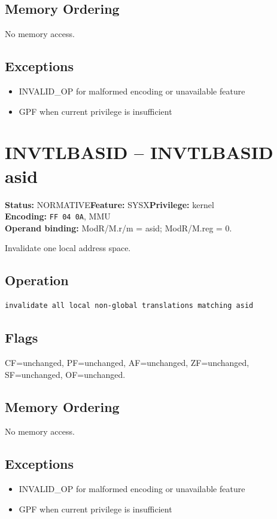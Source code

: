 \documentclass[10pt]{article}
\begin{document}
\subsection*{Memory Ordering}
No memory access.
\subsection*{Exceptions}
\begin{itemize}
\item INVALID\_OP for malformed encoding or unavailable feature
\item GPF when current privilege is insufficient
\end{itemize}
\clearpage

\section{INVTLBASID -- INVTLBASID asid}
\textbf{Status:} NORMATIVE\quad \textbf{Feature:} SYSX\quad \textbf{Privilege:} kernel\\
\textbf{Encoding:} \texttt{FF 04 0A}, MMU\\
\textbf{Operand binding:} ModR/M.r/m = asid; ModR/M.reg = 0.

Invalidate one local address space.

\subsection*{Operation}
\begin{lstlisting}
invalidate all local non-global translations matching asid
\end{lstlisting}
\subsection*{Flags}
CF=unchanged, PF=unchanged, AF=unchanged, ZF=unchanged, SF=unchanged, OF=unchanged.
\subsection*{Memory Ordering}
No memory access.
\subsection*{Exceptions}
\begin{itemize}
\item INVALID\_OP for malformed encoding or unavailable feature
\item GPF when current privilege is insufficient
\end{itemize}
\clearpage
\end{document}
